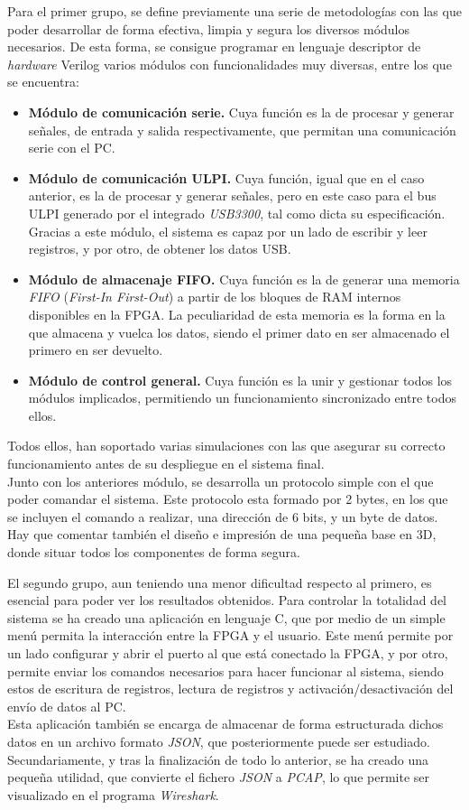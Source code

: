 \begin{resumen}
Para el primer grupo, se define previamente una serie de metodologías con las que poder desarrollar de forma efectiva, limpia y segura los diversos módulos necesarios. De esta forma, se consigue programar en lenguaje descriptor de \emph{hardware} Verilog varios módulos con funcionalidades muy diversas, entre los que se encuentra:
\begin{itemize}
    \item \textbf{Módulo de comunicación serie.} Cuya función es la de procesar y generar señales, de entrada y salida respectivamente, que permitan una comunicación serie con el PC.
    \item \textbf{Módulo de comunicación ULPI.} Cuya función, igual que en el caso anterior, es la de procesar y generar señales, pero en este caso para el bus ULPI generado por el integrado \emph{USB3300}, tal como dicta su especificación. Gracias a este módulo, el sistema es capaz por un lado de escribir y leer registros, y por otro, de obtener los datos USB.
    \item \textbf{Módulo de almacenaje FIFO.} Cuya función es la de generar una memoria \emph{FIFO} (\emph{First-In First-Out}) a partir de los bloques de RAM internos disponibles en la FPGA. La peculiaridad de esta memoria es la forma en la que almacena y vuelca los datos, siendo el primer dato en ser almacenado el primero en ser devuelto.
    \item \textbf{Módulo de control general.} Cuya función es la unir y gestionar todos los módulos implicados, permitiendo un funcionamiento sincronizado entre todos ellos.
\end{itemize}
Todos ellos, han soportado varias simulaciones con las que asegurar su correcto funcionamiento antes de su despliegue en el sistema final. \\
Junto con los anteriores módulo, se desarrolla un protocolo simple con el que poder comandar el sistema. Este protocolo esta formado por 2 bytes, en los que se incluyen el comando a realizar, una dirección de 6 bits, y un byte de datos. \\
Hay que comentar también el diseño e impresión de una pequeña base en 3D, donde situar todos los componentes de forma segura.

El segundo grupo, aun teniendo una menor dificultad respecto al primero, es esencial para poder ver los resultados obtenidos. Para controlar la totalidad del sistema se ha creado una aplicación en lenguaje C, que por medio de un simple menú permita la interacción entre la FPGA y el usuario. Este menú permite por un lado configurar y abrir el puerto al que está conectado la FPGA, y por otro, permite enviar los comandos necesarios para hacer funcionar al sistema, siendo estos de escritura de registros, lectura de registros y activación/desactivación del envío de datos al PC. \\
Esta aplicación también se encarga de almacenar de forma estructurada dichos datos en un archivo formato \emph{JSON}, que posteriormente puede ser estudiado. Secundariamente, y tras la finalización de todo lo anterior, se ha creado una pequeña utilidad, que convierte el fichero \emph{JSON} a \emph{PCAP}, lo que permite ser visualizado en el programa \emph{Wireshark}.


\end{resumen}
